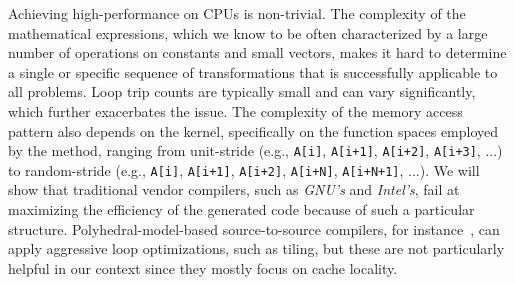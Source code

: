 Achieving high-performance on CPUs is non-trivial. The complexity of the mathematical expressions, which we know to be often characterized by a large number of operations on constants and small vectors, makes it hard to determine a single or specific sequence of transformations that is successfully applicable to all problems. Loop trip counts are typically small and can vary significantly, which further exacerbates the issue. The complexity of the memory access pattern also depends on the kernel, specifically on the function spaces employed by the method, ranging from unit-stride (e.g., \texttt{A[i]}, \texttt{A[i+1]}, \texttt{A[i+2]}, \texttt{A[i+3]}, ...) to random-stride (e.g., \texttt{A[i]}, \texttt{A[i+1]}, \texttt{A[i+2]}, \texttt{A[i+N]}, \texttt{A[i+N+1]}, ...). We will show that traditional vendor compilers, such as \emph{GNU's} and \emph{Intel's}, fail at maximizing the efficiency of the generated code because of such a particular structure. Polyhedral-model-based source-to-source compilers, for instance~\cite{pluto}, can apply aggressive loop optimizations, such as tiling, but these are not particularly helpful in our context since they mostly focus on cache locality. 

